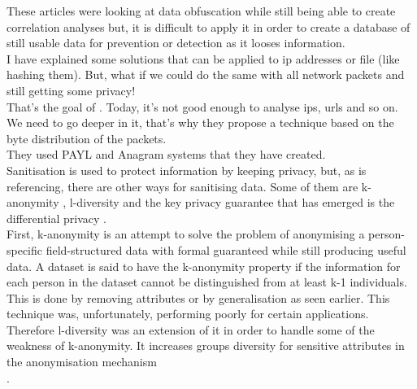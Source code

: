 \documentclass{eplmastersthesis}
\begin{document}
These articles were looking at data obfuscation while still being able to create correlation analyses but, it is difficult to apply it in order to create a database of still usable data for prevention or detection as it looses information.
\\

I have explained some solutions that can be applied to \gls{ip} addresses or file (like hashing them). But, what if we could do the same with all network packets and still getting some privacy!\\
That's the goal of \cite{parekh2006privacy}. Today, it's not good enough to analyse \gls{ip}s, \gls{url}s and so on. We need to go deeper in it, that's why they propose a technique based on the byte distribution of the packets.\\
They used PAYL and Anagram \cite{wang2006network} systems that they have created.\\

Sanitisation is used to protect information by keeping privacy, but, as \cite{mohaisen2017rethinking} is referencing, there are other ways for sanitising data. Some of them are k-anonymity \cite{sweeney2002k}, l-diversity \cite{machanavajjhala2007diversity} and the key privacy guarantee that has emerged is the differential privacy \cite{dwork2008differential}.\\
First, k-anonymity is an attempt to solve the problem of anonymising a person-specific field-structured data with formal guaranteed while still producing useful data. A dataset is said to have the k-anonymity property if the information for each person in the dataset cannot be distinguished from at least k-1 individuals. This is done by removing attributes or by generalisation as seen earlier. This technique was, unfortunately, performing poorly for certain applications. Therefore l-diversity was an extension of it in order to handle some of the weakness of k-anonymity. It increases groups diversity for sensitive attributes in the anonymisation mechanism\\.
\end{document}
